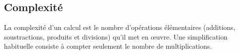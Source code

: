 









\subsection{Complexité}

La complexité d'un calcul est le nombre d'opérations élémentaires (additions,
soustractions,  produits et divisions) qu'il met en œuvre.  Une
simplification habituelle consiste à compter seulement le nombre de
multiplications.

